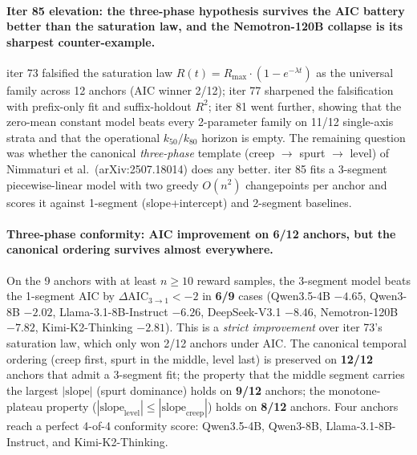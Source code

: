 \paragraph{Iter 85 elevation: the three-phase hypothesis survives the AIC
battery better than the saturation law, and the Nemotron-120B collapse is
its sharpest counter-example.}
\label{par:scaling-iter85}

iter 73 falsified the saturation law
$R(t) = R_\mathrm{max} \cdot (1 - e^{-\lambda t})$ as the universal family
across 12 anchors (AIC winner 2/12); iter 77 sharpened the falsification
with prefix-only fit and suffix-holdout $R^2$; iter 81 went further,
showing that the zero-mean constant model beats every 2-parameter family
on 11/12 single-axis strata and that the operational $k_{50}/k_{80}$
horizon is empty.  The remaining question was whether the canonical
\emph{three-phase} template (creep $\to$ spurt $\to$ level) of
Nimmaturi et al.\ (arXiv:2507.18014) does any better.  iter 85 fits a
3-segment piecewise-linear model with two greedy $O(n^2)$ changepoints
per anchor and scores it against 1-segment (slope+intercept) and
2-segment baselines.

\paragraph{Three-phase conformity: AIC improvement on 6/12 anchors, but
the canonical ordering survives almost everywhere.}
\label{par:scaling-iter85-conformity}

On the 9 anchors with at least $n \ge 10$ reward samples, the 3-segment
model beats the 1-segment AIC by $\Delta\mathrm{AIC}_{3\to 1} < -2$ in
\textbf{6/9} cases (Qwen3.5-4B $-4.65$, Qwen3-8B $-2.02$,
Llama-3.1-8B-Instruct $-6.26$, DeepSeek-V3.1 $-8.46$, Nemotron-120B
$-7.82$, Kimi-K2-Thinking $-2.81$).  This is a \emph{strict improvement}
over iter 73's saturation law, which only won 2/12 anchors under AIC.
The canonical temporal ordering (creep first, spurt in the middle, level
last) is preserved on \textbf{12/12} anchors that admit a 3-segment fit;
the property that the middle segment carries the largest $|\mathrm{slope}|$
(spurt dominance) holds on \textbf{9/12} anchors; the monotone-plateau
property ($|\mathrm{slope}_\mathrm{level}| \le |\mathrm{slope}_\mathrm{creep}|$)
holds on \textbf{8/12} anchors.  Four anchors reach a perfect 4-of-4
conformity score: Qwen3.5-4B, Qwen3-8B, Llama-3.1-8B-Instruct, and
Kimi-K2-Thinking.

